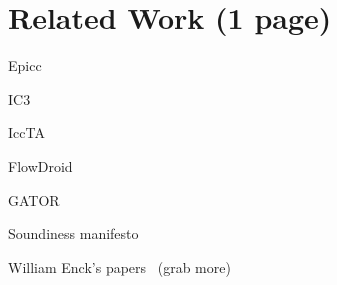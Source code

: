 \section{Related Work (1 page)}

Epicc~\cite{epicc}

IC3~\cite{ic3-icse15}

IccTA~\cite{iccta}

FlowDroid~\cite{flowdroid}

GATOR~\cite{analysis-callbacks-android}

Soundiness manifesto~\cite{soundiness-manifesto}

William Enck's papers~\cite{android-security} (grab more)